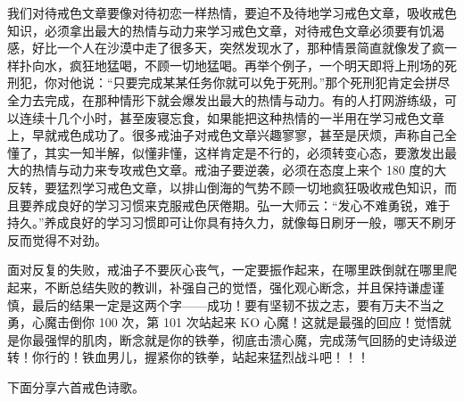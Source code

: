 我们对待戒色文章要像对待初恋一样热情，要迫不及待地学习戒色文章，吸收戒色知识，必须拿出最大的热情与动力来学习戒色文章，对待戒色文章必须要有饥渴感，好比一个人在沙漠中走了很多天，突然发现水了，那种情景简直就像发了疯一样扑向水，疯狂地猛喝，不顾一切地猛喝。再举个例子，一个明天即将上刑场的死刑犯，你对他说：“只要完成某某任务你就可以免于死刑。”那个死刑犯肯定会拼尽全力去完成，在那种情形下就会爆发出最大的热情与动力。有的人打网游练级，可以连续十几个小时，甚至废寝忘食，如果能把这种热情的一半用在学习戒色文章上，早就戒色成功了。很多戒油子对戒色文章兴趣寥寥，甚至是厌烦，声称自己全懂了，其实一知半解，似懂非懂，这样肯定是不行的，必须转变心态，要激发出最大的热情与动力来专攻戒色文章。戒油子要逆袭，必须在态度上来个 180 度的大反转，要猛烈学习戒色文章，以排山倒海的气势不顾一切地疯狂吸收戒色知识，而且要养成良好的学习习惯来克服戒色厌倦期。弘一大师云：“发心不难勇锐，难于持久。”养成良好的学习习惯即可让你具有持久力，就像每日刷牙一般，哪天不刷牙反而觉得不对劲。

面对反复的失败，戒油子不要灰心丧气，一定要振作起来，在哪里跌倒就在哪里爬起来，不断总结失败的教训，补强自己的觉悟，强化观心断念，并且保持谦虚谨慎，最后的结果一定是这两个字——成功！要有坚韧不拔之志，要有万夫不当之勇，心魔击倒你 100 次，第 101 次站起来 KO 心魔！这就是最强的回应！觉悟就是你最强悍的肌肉，断念就是你的铁拳，彻底击溃心魔，完成荡气回肠的史诗级逆转！你行的！铁血男儿，握紧你的铁拳，站起来猛烈战斗吧！！！

下面分享六首戒色诗歌。

